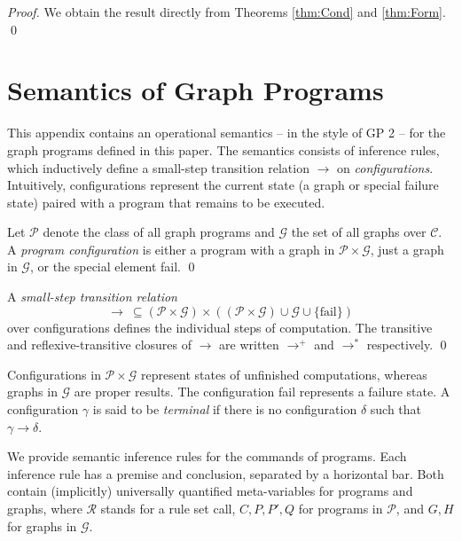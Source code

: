 \documentclass{llncs}
\newcommand{\G}{\mathcal{G}}
\newcommand{\R}{\mathcal{R}}
\begin{document}
	\begin{proof}
		We obtain the result directly from Theorems \ref{thm:Cond} and \ref{thm:Form}.
		\qed
	\end{proof}












	\newpage\section{Semantics of Graph Programs}\label{app:semantics}
	
	This appendix contains an operational semantics -- in the style of GP 2 \cite{Plump12a} -- for the graph programs defined in this paper. The semantics consists of inference rules, which inductively define a small-step transition relation $\rightarrow$ on \emph{configurations}. Intuitively, configurations represent the current state (a graph or special failure state) paired with a program that remains to be executed.

	\begin{definition}[Configuration]\rm
		Let $\mathcal{P}$ denote the class of all graph programs and $\G$ the set of all graphs over $\mathcal{C}$. A \emph{program configuration} is either a program with a graph in $\mathcal{P}\times \G$, just a graph in $\G$, or the special element fail.	
		\qed
	\end{definition}

	\begin{definition}\rm
	    A \emph{small-step transition relation}
	\[ \rightarrow\ \subseteq (\mathcal{P}\times\G) \times ((\mathcal{P}\times\G)\cup\G\cup\{\text{fail}\}) \]
	\noindent over configurations defines the individual steps of computation. The transitive and reflexive-transitive closures of $\rightarrow$ are written $\rightarrow^+$ and $\rightarrow^*$ respectively.
		\qed
	\end{definition}

	Configurations in $\mathcal{P}\times \G$ represent states of unfinished computations, whereas graphs in $\G$ are proper results. The configuration fail represents a failure state. A configuration $\gamma$ is said to be \emph{terminal} if there is no configuration $\delta$ such that $\gamma \rightarrow \delta$.

	We provide semantic inference rules for the commands of programs. Each inference rule has a premise and conclusion, separated by a horizontal bar. Both contain (implicitly) universally quantified meta-variables for programs and graphs, where $\R$ stands for a rule set call, $C,P,P',Q$ for programs in $\mathcal{P}$, and $G,H$ for graphs in $\G$.
\end{document}
